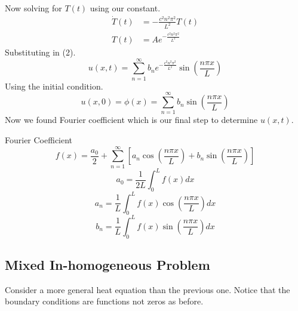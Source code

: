 \documentclass[]{article}
\begin{document}
Now solving for $T(t)$ using our constant.
\begin{align*}
\dot{T}(t) &= -\frac{c^2 n^2 \pi^2}{L^2} T(t)
\\
T(t) &= Ae^{-\frac{c^2 n^2 \pi^2}{L^2}}
\end{align*}
Substituting in (2).
\[
    u(x,t) = \sum_{n=1}^{\infty} b_n e^{-\frac{c^2 n^2 \pi^2}{L^2}}\sin\left(\frac{n\pi x}{L}\right)    
\]
Using the initial condition.
\[
    u(x,0) = \phi(x) = \sum_{n=1}^{\infty} b_n \sin\left(\frac{n\pi x}{L}\right)    
\]
Now we found Fourier coefficient which is our final step to determine $u(x,t)$.
\begin{enrichment*}{Fourier Coefficient}
    \[
        f(x) = \frac{a_0}{2}  + \sum_{n=1}^{\infty}\left[a_n \cos\left(\frac{n\pi x}{L}\right) + b_n \sin\left(\frac{n\pi x}{L}\right) \right]
    \]
    \[
        a_0 = \frac{1}{2L}\int_{0}^{L}f(x)dx
    \]
    \[
        a_n = \frac{1}{L}\int_{0}^{L}f(x)\cos\left(\frac{n\pi x}{L}\right)dx
    \]
    \[
        b_n = \frac{1}{L}\int_{0}^{L}f(x)\sin\left(\frac{n\pi x}{L}\right)dx
    \]
\end{enrichment*}

\setcounter{equation}{0}
\subsection{Mixed In-homogeneous Problem}
Consider a more general heat equation than the previous one. Notice that the boundary conditions are functions not zeros as before.
\end{document}
